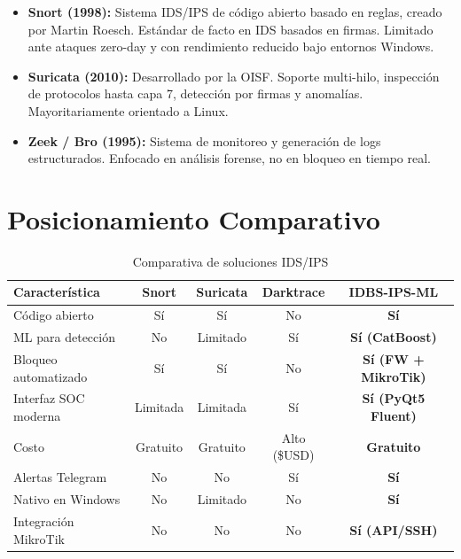 \documentclass[12pt, letterpaper, oneside]{report}
\newcommand{\tabhead}[1]{\textbf{\color{white}#1}}
\begin{document}
\begin{itemize}[leftmargin=*]
  \item \textbf{Snort (1998):} Sistema IDS/IPS de código abierto basado en reglas, creado por Martin Roesch. Estándar de facto en IDS basados en firmas. Limitado ante ataques zero-day y con rendimiento reducido bajo entornos Windows.
  \item \textbf{Suricata (2010):} Desarrollado por la OISF. Soporte multi-hilo, inspección de protocolos hasta capa 7, detección por firmas y anomalías. Mayoritariamente orientado a Linux.
  \item \textbf{Zeek / Bro (1995):} Sistema de monitoreo y generación de logs estructurados. Enfocado en análisis forense, no en bloqueo en tiempo real.
\end{itemize}

\section{Posicionamiento Comparativo}

\begin{table}[H]
  \centering
  \caption{Comparativa de soluciones IDS/IPS}
  \label{tab:comparativa}
  \begin{tabularx}{\textwidth}{X c c c c}
    \toprule
    \rowcolor{unipazblue}
    \tabhead{Característica} & \tabhead{Snort} & \tabhead{Suricata} & \tabhead{Darktrace} & \tabhead{\textbf{IDBS-IPS-ML}} \\
    \midrule
    Código abierto & Sí & Sí & No & \textbf{Sí} \\
    ML para detección & No & Limitado & Sí & \textbf{Sí (CatBoost)} \\
    Bloqueo automatizado & Sí & Sí & No & \textbf{Sí (FW + MikroTik)} \\
    Interfaz SOC moderna & Limitada & Limitada & Sí & \textbf{Sí (PyQt5 Fluent)} \\
    Costo & Gratuito & Gratuito & Alto (\$USD) & \textbf{Gratuito} \\
    Alertas Telegram & No & No & Sí & \textbf{Sí} \\
    Nativo en Windows & No & Limitado & No & \textbf{Sí} \\
    Integración MikroTik & No & No & No & \textbf{Sí (API/SSH)} \\
    \bottomrule
  \end{tabularx}
\end{table}

\end{document}
